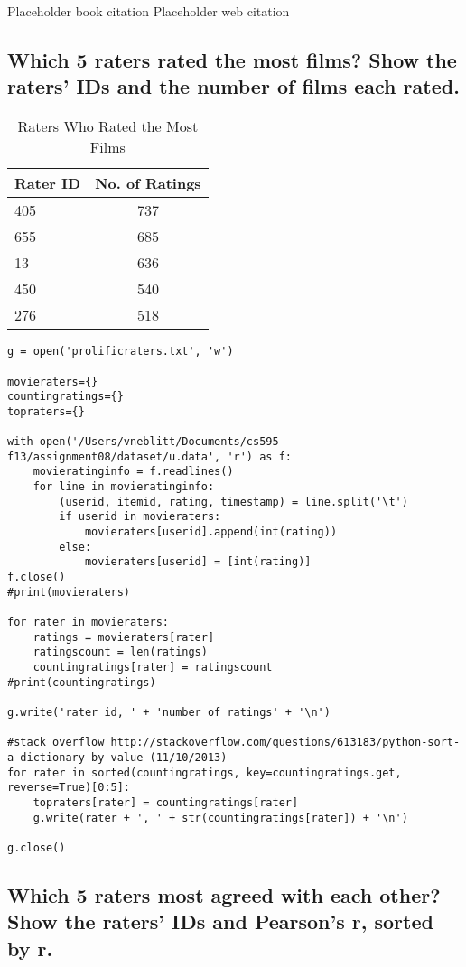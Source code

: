 \documentclass{article}
\begin{document}
Placeholder book citation\cite{pci}
Placeholder web citation\cite{numpymean}

\newpage
\subsection{Which 5 raters rated the most films? Show the raters' IDs and the number of films each rated.}

\begin{table}[!h]
\centering
\begin{tabular}{l c}
Rater ID & No. of Ratings \\
\hline
405 & 737  \\
655 & 685  \\
13 & 636  \\
450 & 540  \\
276 & 518  \\
\hline
\end{tabular}
\caption{Raters Who Rated the Most Films}
\end{table}

\begin{lstlisting}[frame=single, caption=prolificraters.py, label=prolificraters]
g = open('prolificraters.txt', 'w')

movieraters={}
countingratings={}
topraters={}

with open('/Users/vneblitt/Documents/cs595-f13/assignment08/dataset/u.data', 'r') as f:
	movieratinginfo = f.readlines()
	for line in movieratinginfo:
		(userid, itemid, rating, timestamp) = line.split('\t')
		if userid in movieraters:
			movieraters[userid].append(int(rating))
		else:
			movieraters[userid] = [int(rating)]
f.close()
#print(movieraters)

for rater in movieraters:
	ratings = movieraters[rater]
	ratingscount = len(ratings)
	countingratings[rater] = ratingscount
#print(countingratings)

g.write('rater id, ' + 'number of ratings' + '\n')

#stack overflow http://stackoverflow.com/questions/613183/python-sort-a-dictionary-by-value (11/10/2013)
for rater in sorted(countingratings, key=countingratings.get, reverse=True)[0:5]:
	topraters[rater] = countingratings[rater]
	g.write(rater + ', ' + str(countingratings[rater]) + '\n')

g.close()
\end{lstlisting}

\newpage
\subsection{Which 5 raters most agreed with each other? Show the raters' IDs and Pearson's r, sorted by r.}
\end{document}
